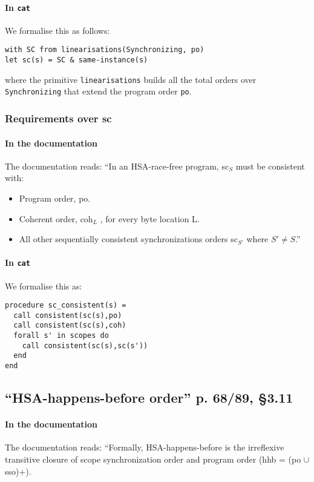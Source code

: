 \documentclass[a4paper]{article}
\begin{document}
\paragraph{In {\tt cat}}
We formalise this as follows:
\begin{verbatim}
with SC from linearisations(Synchronizing, po)
let sc(s) = SC & same-instance(s)
\end{verbatim}

where the primitive {\tt linearisations} builds all the total orders over {\tt
Synchronizing} that extend the program order {\tt po}.

\subsubsection{Requirements over sc}

\paragraph{In the documentation}
The documentation reads: ``In an HSA-race-free program, sc$_S$ must be
consistent with:
\begin{itemize}
\item Program order, po.
\item Coherent order, coh$_L$ , for every byte location L.
\item All other sequentially consistent synchronizations orders sc$_{S'}$ where
$S' \neq S$.''
\end{itemize} 

\paragraph{In {\tt cat}}
We formalise this as:
\begin{verbatim}
procedure sc_consistent(s) =
  call consistent(sc(s),po)
  call consistent(sc(s),coh)
  forall s' in scopes do
    call consistent(sc(s),sc(s'))
  end
end
\end{verbatim} 

\subsection{``HSA-happens-before order'' p. 68/89, \S 3.11}

\paragraph{In the documentation}
The documentation reads: ``Formally, HSA-happens-before is the irreflexive
transitive closure of scope synchronization order and program order (hhb = (po
$\cup$ sso)+).
\end{document}
